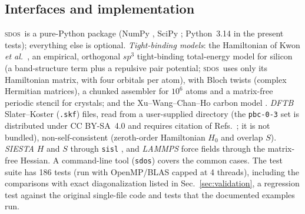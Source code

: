 \documentclass[reprint,nofootinbib,superscriptaddress,amsmath,amssymb,aps,prb,floatfix]{revtex4-2}
\newcommand{\sdos}{\textsc{sdos}}
\begin{document}
\subsection{Interfaces and implementation}
\label{sec:impl}

\sdos\ is a pure-Python package (NumPy \cite{numpy}, SciPy \cite{scipy}; Python~3.14 in the present tests); everything else is optional.
\emph{Tight-binding models}: the Hamiltonian of Kwon \emph{et al.}\ \cite{kwon}, an empirical, orthogonal $sp^3$ tight-binding total-energy model for silicon (a band-structure term plus a repulsive pair potential; \sdos\ uses only its Hamiltonian matrix, with four orbitals per atom), with Bloch twists (complex Hermitian matrices), a chunked assembler for $10^6$ atoms and a matrix-free periodic stencil for crystals; and the Xu--Wang--Chan--Ho carbon model \cite{xu}.
\emph{DFTB} Slater--Koster (\texttt{.skf}) files, read from a user-supplied directory (the \texttt{pbc-0-3} set \cite{pbc03} is distributed under CC BY-SA~4.0 and requires citation of Refs.~\cite{sieck2000,sieck2003}; it is not bundled), non-self-consistent \cite{porezag,elstner} (zeroth-order Hamiltonian $H_0$ and overlap $S$).
\emph{SIESTA} $H$ and $S$ through \texttt{sisl} \cite{sisl,siesta2002,siesta2020}, and \emph{LAMMPS} force fields \cite{lammps} through the matrix-free Hessian.
A command-line tool (\texttt{sdos}) covers the common cases.
The test suite has 186 tests (run with OpenMP/BLAS capped at 4 threads), including the comparisons with exact diagonalization listed in Sec.~\ref{sec:validation}, a regression test against the original single-file code and tests that the documented examples run.
\end{document}
